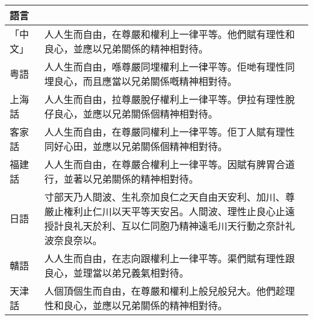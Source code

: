 \documentclass[a5paper, 10pt, openany]{book} %
\begin{document}
\begin{longtable}{|l|p{8cm}|}
  \hline

  \textbf{語言} & \textbf{}                                                                                                                                                       \\
  \hline
  \jcz{}
  \batang{}
  「中文」        & 人人生而自由，在尊嚴和權利上一律平等。他們賦有理性和良心，並應以兄弟關係的精神相對待。                                                                                                                     \\
  \hline
  粤語          & 人人生而自由，喺尊嚴同埋權利上一律平等。佢哋有理性同埋良心，而且應當以兄弟關係嘅精神相對待。                                                                                                                  \\
  \hline
  上海話         & 人人生而自由，拉尊嚴脫仔權利上一律平等。伊拉有理性脫仔良心，並應以兄弟關係個精神相對待。                                                                                                                    \\
  \hline
  客家話         & 人人生而自由，在尊嚴同權利上一律平等。佢丁人賦有理性同好心田，並應以兄弟關係個精神相對待。                                                                                                                   \\
  \hline
  福建話         & 人人生而自由，在尊嚴合權利上一律平等。因賦有脾胃合道行，並著以兄弟關係的精神相對待。                                                                                                                      \\
  \hline
  日語          & 寸部天乃人間波、生礼奈加良仁之天自由天安利、加川、尊厳止権利止仁川以天平等天安呂。人間波、理性止良心止遠授計良礼天於利、互以仁同胞乃精神遠毛川天行動之奈計礼波奈良奈以。                                                                            \\
  \hline
  贛語          & 人人生而自由，在志向跟權利上一律平等。渠們賦有理性跟良心，並理當以弟兄義氣相對待。                                                                                                                       \\
  \hline
  天津話         & 人個頂個生而自由，在尊嚴和權利上般兒般兒大。他們趁理性和良心，並應以兄弟關係的精神相對待。                                                                                                                   \\
  \hline

\end{longtable}
\end{document}
